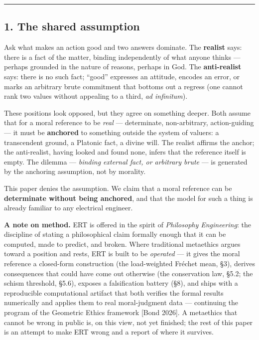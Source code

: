 \documentclass[
]{article}
\begin{document}
\begin{center}\rule{0.5\linewidth}{0.5pt}\end{center}

\subsection{1. The shared assumption}\label{the-shared-assumption}

Ask what makes an action good and two answers dominate. The
\textbf{realist} says: there is a fact of the matter, binding
independently of what anyone thinks --- perhaps grounded in the nature
of reasons, perhaps in God. The \textbf{anti-realist} says: there is no
such fact; ``good'' expresses an attitude, encodes an error, or marks an
arbitrary brute commitment that bottoms out a regress (one cannot rank
two values without appealing to a third, \emph{ad infinitum}).

These positions look opposed, but they agree on something deeper. Both
assume that for a moral reference to be \emph{real} --- determinate,
non-arbitrary, action-guiding --- it must be \textbf{anchored} to
something outside the system of valuers: a transcendent ground, a
Platonic fact, a divine will. The realist affirms the anchor; the
anti-realist, having looked and found none, infers that the reference
itself is empty. The dilemma --- \emph{binding external fact, or
arbitrary brute} --- is generated by the anchoring assumption, not by
morality.

This paper denies the assumption. We claim that a moral reference can be
\textbf{determinate without being anchored}, and that the model for such
a thing is already familiar to any electrical engineer.

\textbf{A note on method.} ERT is offered in the spirit of
\emph{Philosophy Engineering}: the discipline of stating a philosophical
claim formally enough that it can be computed, made to predict, and
broken. Where traditional metaethics argues toward a position and rests,
ERT is built to be \emph{operated} --- it gives the moral reference a
closed-form construction (the load-weighted Fréchet mean, §3), derives
consequences that could have come out otherwise (the conservation law,
§5.2; the schism threshold, §5.6), exposes a falsification battery (§8),
and ships with a reproducible computational artifact that both verifies
the formal results numerically and applies them to real moral-judgment
data --- continuing the program of the Geometric Ethics framework
{[}Bond 2026{]}. A metaethics that cannot be wrong in public is, on this
view, not yet finished; the rest of this paper is an attempt to make ERT
wrong and a report of where it survives.
\end{document}

